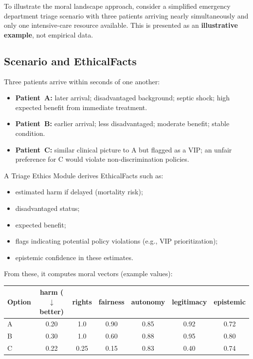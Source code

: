 \documentclass[11pt]{article}
\begin{document}
To illustrate the moral landscape approach, consider a simplified emergency department triage scenario with three patients arriving nearly simultaneously and only one intensive-care resource available. This is presented as an \textbf{illustrative example}, not empirical data.

\subsection{Scenario and EthicalFacts}

Three patients arrive within seconds of one another:

\begin{itemize}
  \item \textbf{Patient~A:} later arrival; disadvantaged background; septic shock; high expected benefit from immediate treatment.
  \item \textbf{Patient~B:} earlier arrival; less disadvantaged; moderate benefit; stable condition.
  \item \textbf{Patient~C:} similar clinical picture to A but flagged as a VIP; an unfair preference for C would violate non-discrimination policies.
\end{itemize}

A Triage Ethics Module derives EthicalFacts such as:

\begin{itemize}
  \item estimated harm if delayed (mortality risk);
  \item disadvantaged status;
  \item expected benefit;
  \item flags indicating potential policy violations (e.g., VIP prioritization);
  \item epistemic confidence in these estimates.
\end{itemize}

From these, it computes moral vectors (example values):

\begin{table}[h]
\centering
\begin{tabular}{lcccccc}
\toprule
\textbf{Option} & \textbf{harm} ($\downarrow$ better) & \textbf{rights} & \textbf{fairness} & \textbf{autonomy} & \textbf{legitimacy} & \textbf{epistemic} \\
\midrule
A & 0.20 & 1.0 & 0.90 & 0.85 & 0.92 & 0.72 \\
B & 0.30 & 1.0 & 0.60 & 0.88 & 0.95 & 0.80 \\
C & 0.22 & 0.25 & 0.15 & 0.83 & 0.40 & 0.74 \\
\bottomrule
\end{tabular}
\end{table}
\end{document}
